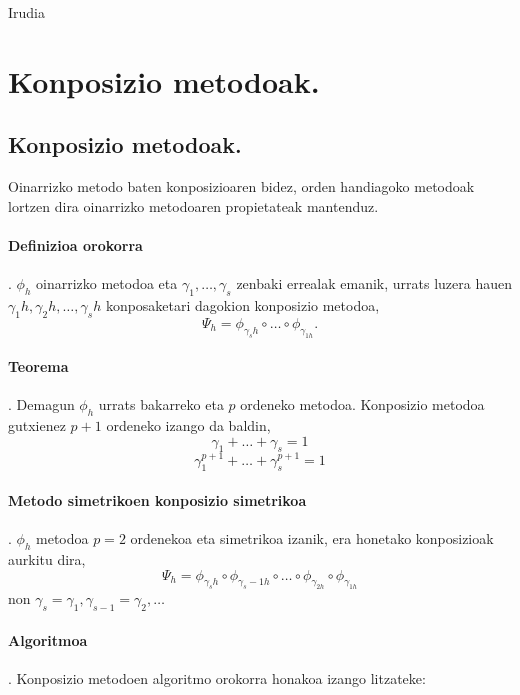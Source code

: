 Irudia 
 

\section{Konposizio metodoak.}

\subsection{Konposizio metodoak.}

Oinarrizko metodo baten konposizioaren bidez, orden handiagoko metodoak lortzen dira oinarrizko metodoaren propietateak mantenduz.

\paragraph*{\textbf{Definizioa orokorra}}.
$\phi_h$ oinarrizko metodoa eta $\gamma_1,\dots,\gamma_s$ zenbaki errealak emanik, urrats luzera hauen $\gamma_1 h,\gamma_2 h,\dots,\gamma_s h$ konposaketari dagokion konposizio metodoa,
\begin{equation}
\Psi_h=\phi_{\gamma_s h} \circ \dots \circ \phi_{\gamma_{1 h}}.
\end{equation}

\paragraph*{\textbf{Teorema}}.
Demagun $\phi_h$ urrats bakarreko eta $p$ ordeneko metodoa. Konposizio metodoa gutxienez $p+1$ ordeneko izango da baldin,
\[\gamma_1+\dots+\gamma_s=1\]
\begin{equation}
\gamma_1^{p+1}+\dots+\gamma_s^{p+1}=1
\end{equation}

\paragraph*{\textbf{Metodo simetrikoen konposizio simetrikoa}}.
$\phi_h$ metodoa $p=2$ ordenekoa eta simetrikoa izanik, era honetako konposizioak aurkitu dira,
\begin{equation}
\Psi_h=\phi_{\gamma_s h} \circ \phi_{\gamma_s-1 h} \circ \dots \circ \phi_{\gamma_{2 h}} \circ \phi_{\gamma_{1 h}} 
\end{equation}
non $\gamma_s=\gamma_1, \gamma_{s-1}=\gamma_2,\dots$ 

\paragraph*{\textbf{Algoritmoa}}.
Konposizio metodoen algoritmo orokorra honakoa izango litzateke:

